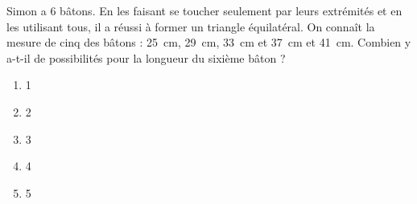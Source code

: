 Simon a 6 bâtons. En les faisant se toucher seulement par leurs extrémités et en les utilisant tous, il a réussi à former un triangle équilatéral. On connaît la mesure de cinq des bâtons : 25~cm, 29~cm, 33~cm et 37~cm et 41~cm. Combien y a-t-il de possibilités pour la longueur du sixième bâton ?
\begin{multicols}{5}
  \begin{enumerate}[A/]
  \item 1
  \item 2
  \item 3
  \item 4
  \item 5
  \end{enumerate}
\end{multicols}